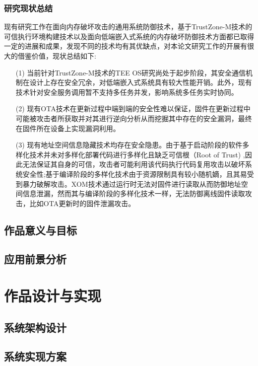 \documentclass[12pt,a4paper]{ctexart}
\begin{document}
\subsubsection{研究现状总结}
\par 现有研究工作在面向内存破坏攻击的通用系统防御技术，基于TrustZone-M技术的可信执行环境构建技术以及面向低端嵌入式系统的内存破坏防御技术方面都已取得一定的进展和成果，发现不同的技术均有其优缺点，对本论文研究工作的开展有很大的借鉴价值，现状总结如下:
\begin{itemize}
    \item[(1)] 当前针对TrustZone-M技术的TEE OS研究尚处于起步阶段，其安全通信机制在设计上存在安全冗余，对低端嵌入式系统具有较大性能开销。此外，现有技术针对安全服务调用暂不支持多任务并发，影响系统多任务实时协同。
    \item[(2)] 现有OTA技术在更新过程中端到端的安全性难以保证，固件在更新过程中可能被攻击者所获取并对其进行逆向分析从而挖掘其中存在的安全漏洞，最终在固件所在设备上实现漏洞利用。
    \item[(3)] 现有地址空间信息隐藏技术均存在安全隐患。由于基于启动阶段的软件多样化技术并未对多样化部署代码进行多样化且缺乏可信根（Root of Trust) ,因此无法保证其自身的可信，攻击者可能利用该代码执行代码复用攻击以破坏系统安全性;基于编译阶段的多样化技术由于资源限制具有较小随机嫡，且其易受到暴力破解攻击。XOM技术通过运行时无法对固件进行读取从而防御地址空间信息泄漏，然而其与编译阶段的多样化技术一样，无法防御离线固件读取攻击，比如OTA更新时的固件泄漏攻击。
\end{itemize}
\subsection{作品意义与目标}

\subsection{应用前景分析}

\section{作品设计与实现}

\subsection{系统架构设计}

\subsection{系统实现方案}
\end{document}
